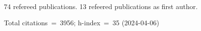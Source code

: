 74 refereed publications. 13 refeered publications as first author.

Total citations~=~3956; h-index~=~35 (2024-04-06)